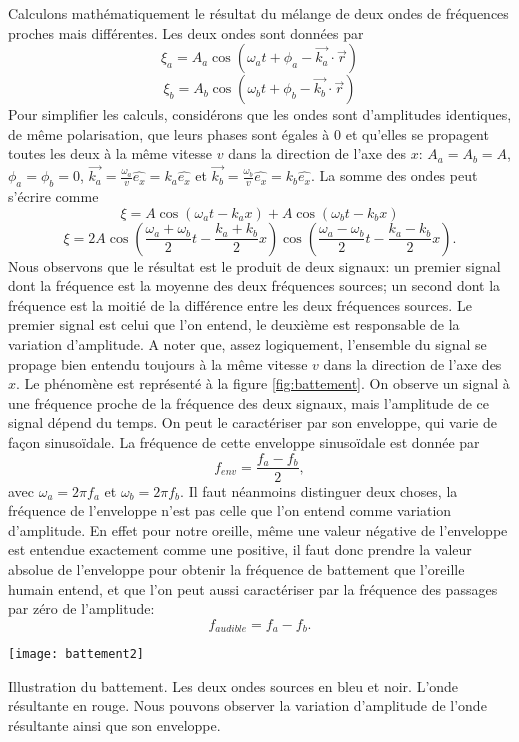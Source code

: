 Calculons mathématiquement le résultat du mélange de deux ondes de fréquences proches mais différentes. Les deux ondes sont données par
$$ \xi_a=A_a\cos(\omega_at+\phi_a-\vec{k_a}\cdot\vec{r})$$
$$ \xi_b=A_b\cos(\omega_bt+\phi_b-\vec{k_b}\cdot\vec{r})$$
Pour simplifier les calculs, considérons que les ondes sont d'amplitudes identiques, de même polarisation, que leurs phases sont égales à $0$ et qu'elles se propagent toutes les deux à la même vitesse $v$ dans la direction de l'axe des $x$: $A_a=A_b=A$, $\phi_a=\phi_b=0$, $\vec{k_a}=\frac{\omega_a}{v}\hat{e_x}=k_a\hat{e_x}$ et $\vec{k_b}=\frac{\omega_b}{v}\hat{e_x}=k_b\hat{e_x}$. La somme des ondes peut s'écrire comme
$$ \xi=A\cos(\omega_at-k_ax) + A\cos(\omega_bt-k_bx)$$
$$ \xi=2A\cos\left(\frac{\omega_a+\omega_b}{2}t-\frac{k_a+k_b}{2}x\right)\cos\left(\frac{\omega_a-\omega_b}{2}t-\frac{k_a-k_b}{2}x\right).$$
Nous observons que le résultat est le produit de deux signaux: un premier signal dont la fréquence est la moyenne des deux fréquences sources; un second dont la fréquence est la moitié de la différence entre les deux fréquences sources. Le premier signal est celui que l'on entend, le deuxième est responsable de la variation d'amplitude. A noter que, assez logiquement, l'ensemble du signal se propage bien entendu toujours à la même vitesse $v$ dans la direction de l'axe des $x$. Le phénomène est représenté à la figure \ref{fig:battement}. On observe un signal à une fréquence proche de la fréquence des deux signaux, mais l'amplitude de ce signal dépend du temps. On peut le caractériser par son enveloppe, qui varie de façon sinusoïdale. La fréquence de cette enveloppe sinusoïdale est donnée par $$f_{env}=\frac{f_a-f_b}{2},$$ avec $\omega_a=2\pi f_a$ et $\omega_b=2\pi f_b$. 
Il faut néanmoins distinguer deux choses, la fréquence de l'enveloppe n'est pas celle que l'on entend comme variation d'amplitude. En effet pour notre oreille, même une valeur négative de l'enveloppe est entendue exactement comme une positive, il faut donc prendre la valeur absolue de l'enveloppe pour obtenir la fréquence de battement que l'oreille humain entend, et que l'on peut aussi caractériser par la fréquence des passages par zéro de l'amplitude:
$$f_{audible}=f_a-f_b.$$
\begin{marginfigure}[-10cm]\centering
\texttt{[image: battement2]}
\caption{Illustration du battement. Les deux ondes sources en bleu et noir. L'onde résultante en rouge. Nous pouvons observer la variation d'amplitude de l'onde résultante ainsi que son enveloppe.}
\label{fig:battement}
\end{marginfigure}
